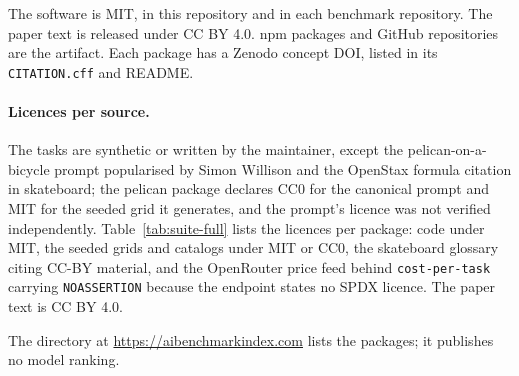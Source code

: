 The software is MIT, in this repository and in each benchmark repository. The paper text is released under CC BY 4.0. npm packages and GitHub repositories are the artifact. Each package has a Zenodo concept DOI, listed in its \texttt{CITATION.cff} and README.

\paragraph{Licences per source.}
The tasks are synthetic or written by the maintainer, except the pelican-on-a-bicycle prompt popularised by Simon Willison and the OpenStax formula citation in skateboard; the pelican package declares CC0 for the canonical prompt and MIT for the seeded grid it generates, and the prompt's licence was not verified independently. Table~\ref{tab:suite-full} lists the licences per package: code under MIT, the seeded grids and catalogs under MIT or CC0, the skateboard glossary citing CC-BY material, and the OpenRouter price feed behind \texttt{cost-per-task} carrying \texttt{NOASSERTION} because the endpoint states no SPDX licence. The paper text is CC BY 4.0.

The directory at \url{https://aibenchmarkindex.com} lists the packages; it publishes no model ranking.
